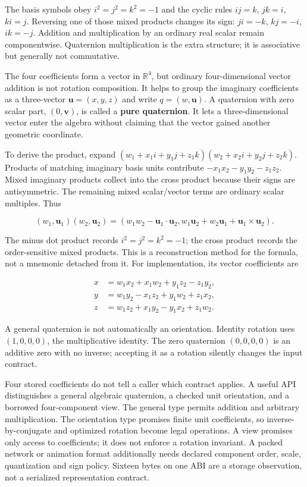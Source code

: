 The basis symbols obey \(i^2=j^2=k^2=-1\) and the cyclic rules \(ij=k\), \(jk=i\), \(ki=j\). Reversing one of those mixed products changes its sign: \(ji=-k\), \(kj=-i\), \(ik=-j\). Addition and multiplication by an ordinary real scalar remain componentwise. Quaternion multiplication is the extra structure; it is associative but generally not commutative.

The four coefficients form a vector in \(\mathbb R^4\), but ordinary four-dimensional vector addition is not rotation composition. It helps to group the imaginary coefficients as a three-vector \(\mathbf u=(x,y,z)\) and write \(q=(w,\mathbf u)\). A quaternion with zero scalar part, \((0,\mathbf v)\), is called a \textbf{pure quaternion}. It lets a three-dimensional vector enter the algebra without claiming that the vector gained another geometric coordinate.

To derive the product, expand \((w_1+x_1i+y_1j+z_1k)(w_2+x_2i+y_2j+z_2k)\). Products of matching imaginary basis units contribute \(-x_1x_2-y_1y_2-z_1z_2\). Mixed imaginary products collect into the cross product because their signs are antisymmetric. The remaining mixed scalar/vector terms are ordinary scalar multiples. Thus

\[
(w_1,\mathbf u_1)(w_2,\mathbf u_2)=
\left(w_1w_2-\mathbf u_1\cdot\mathbf u_2,
w_1\mathbf u_2+w_2\mathbf u_1+\mathbf u_1\times\mathbf u_2\right).
\]

The minus dot product records \(i^2=j^2=k^2=-1\); the cross product records the order-sensitive mixed products. This is a reconstruction method for the formula, not a mnemonic detached from it. For implementation, its vector coefficients are

\[
\begin{aligned}
x&=w_1x_2+x_1w_2+y_1z_2-z_1y_2,\\
y&=w_1y_2-x_1z_2+y_1w_2+z_1x_2,\\
z&=w_1z_2+x_1y_2-y_1x_2+z_1w_2.
\end{aligned}
\]

A general quaternion is not automatically an orientation. Identity rotation uses \((1,0,0,0)\), the multiplicative identity. The zero quaternion \((0,0,0,0)\) is an additive zero with no inverse; accepting it as a rotation silently changes the input contract.

Four stored coefficients do not tell a caller which contract applies. A useful API distinguishes a general algebraic quaternion, a checked unit orientation, and a borrowed four-component view. The general type permits addition and arbitrary multiplication. The orientation type promises finite unit coefficients, so inverse-by-conjugate and optimized rotation become legal operations. A view promises only access to coefficients; it does not enforce a rotation invariant. A packed network or animation format additionally needs declared component order, scale, quantization and sign policy. Sixteen bytes on one ABI are a storage observation, not a serialized representation contract.

